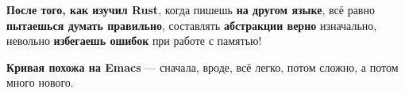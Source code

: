 {\begin{frame}
{      \textbf{После того, как изучил Rust}, когда пишешь \textbf{на другом
        языке}, всё равно \textbf{пытаешься думать правильно}, составлять
      \textbf{абстракции верно} изначально, невольно \textbf{избегаешь ошибок}
      при работе с памятью!

      \textbf{Кривая похожа на Emacs} --- сначала, вроде, всё легко, потом
      сложно, а потом много нового.

    }

  \end{frame}
}